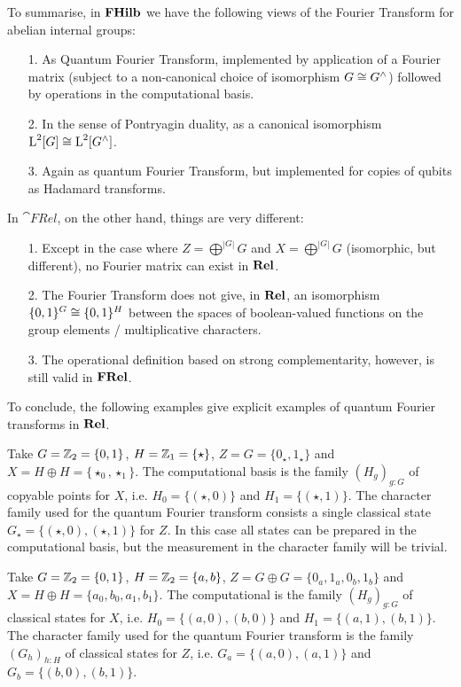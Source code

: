 To summarise, in $\mathbf{FHilb}$ we have the following views of the Fourier Transform for abelian internal groups:
\begin{enumerate}
\item[1.] As Quantum Fourier Transform, implemented by application of a Fourier matrix (subject to a non-canonical choice of isomorphism $G \cong G^\wedge$) followed by operations in the computational basis.
\item[2.] In the sense of Pontryagin duality, as a canonical isomorphism $\operatorname{L}^2[G] \cong \operatorname{L}^2[G^\wedge]$.
\item[3.] Again as quantum Fourier Transform, but implemented for copies of qubits as Hadamard transforms.
\end{enumerate}

In $\cat{FRel}$, on the other hand, things are very different:
\begin{enumerate}
\item[1.] Except in the case where $Z = \bigoplus^{|G|}G$ and $X = \bigoplus^{|G|}G$ (isomorphic, but different), no Fourier matrix can exist in $\mathbf{Rel}$.
\item[2.] The Fourier Transform does not give, in $\mathbf{Rel}$, an isomorphism $\{0,1\}^G \cong \{0,1\}^H$ between the spaces of boolean-valued functions on the group elements / multiplicative characters.
\item[3.] The operational definition based on strong complementarity, however, is still valid in $\mathbf{FRel}$. 
\end{enumerate}

To conclude, the following examples give explicit examples of quantum Fourier transforms in $\mathbf{Rel}$.

\begin{example}
Take $G=\mathbb{Z}_{2}=\{0,1\}$, $H=\mathbb{Z}_{1}=\{\star\}$, $Z = G = \{ 0_\star,1_\star \}$ and $X=H\oplus H = \{ \star_0,\star_1 \}$. The computational basis is the family $(H_g)_{g:G}$ of copyable points for $X$, i.e. $H_0 = \{(\star,0)\}$ and $H_1 = \{(\star,1)\}$. The character family used for the quantum Fourier transform consists a single classical state $G_\star = \{(\star,0), (\star,1)\}$ for $Z$. In this case all states can be prepared in the computational basis, but the measurement in the character family will be trivial.
\end{example}

\begin{example}
Take $G=\mathbb{Z}_{2}=\{0,1\}$, $H=\mathbb{Z}_{2}=\{a,b\}$, $Z = G \oplus G = \{ 0_a,1_a,0_b,1_b\}$ and $X= H \oplus H = \{ a_0, b_0, a_1, b_1 \}$. The computational  is the family $(H_g)_{g:G}$ of classical states for $X$, i.e. $H_0 = \{(a,0),(b,0)\}$ and $H_1 = \{(a,1),(b,1)\}$. The character family used for the quantum Fourier transform is the family $(G_h)_{h:H}$ of classical states for $Z$, i.e. $G_a = \{(a,0),(a,1)\}$ and $G_b = \{(b,0),(b,1)\}$.
\end{example}

